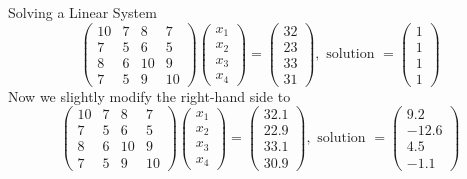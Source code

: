 Solving a Linear System \[
    \begin{pmatrix}
        10 & 7 & 8 & 7 \\
        7 & 5 & 6 & 5 \\
        8 & 6 & 10 & 9 \\
        7 & 5 & 9 & 10
    \end{pmatrix} \begin{pmatrix}
        x_1 \\ x_2 \\ x_3 \\ x_4
    \end{pmatrix}
    =
    \begin{pmatrix}
        32 \\ 23 \\ 33\\ 31
    \end{pmatrix}, \mbox{ solution } =
    \begin{pmatrix}
        1 \\ 1 \\ 1 \\ 1
    \end{pmatrix}
\]
Now we slightly modify the right-hand side to \[
    \begin{pmatrix}
        10 & 7 & 8 & 7 \\
        7 & 5 & 6 & 5 \\
        8 & 6 & 10 & 9 \\
        7 & 5 & 9 & 10
    \end{pmatrix}
    \begin{pmatrix}
        x_1 \\ x_2 \\ x_3 \\ x_4
    \end{pmatrix}
    =
    \begin{pmatrix}
        32.1 \\ 22.9 \\ 33.1 \\ 30.9
    \end{pmatrix}, \mbox{ solution } =
    \begin{pmatrix}
        9.2 \\ -12.6 \\ 4.5 \\ -1.1
    \end{pmatrix}
\]
